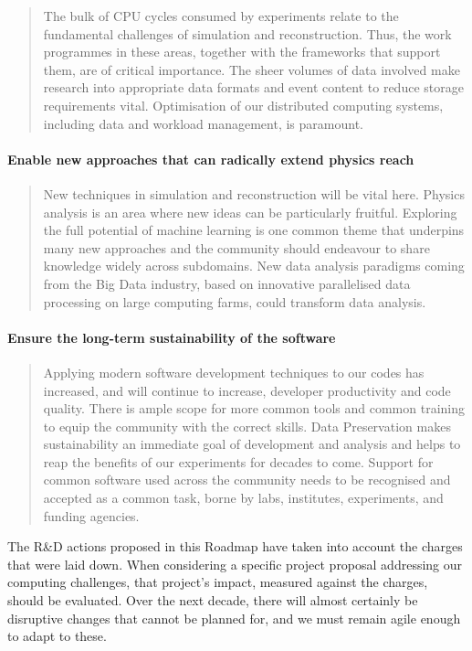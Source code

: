\begin{quote}
The bulk of CPU cycles consumed by experiments relate to the fundamental
challenges of simulation and reconstruction. Thus, the work programmes
in these areas, together with the frameworks that support them, are of
critical importance. The sheer volumes of data involved make research
into appropriate data formats and event content to reduce storage
requirements vital. Optimisation of our distributed computing systems,
including data and workload management, is paramount.
\end{quote}

\paragraph{Enable new approaches that can radically extend physics reach}

\begin{quote}
New techniques in simulation and reconstruction will be vital here.
Phys\-ics analysis is an area where new ideas can be particularly
fruitful. Exploring the full potential of machine learning is one common
theme that underpins many new approaches and the community should
endeavour to share knowledge widely across subdomains. New data analysis
paradigms coming from the Big Data industry, based on innovative
parallelised data processing on large computing farms, could transform
data analysis.
\end{quote}

\paragraph{Ensure the long-term sustainability of the software}

\begin{quote}
Applying modern software development techniques to our codes has
increased, and will continue to increase, developer productivity and
code quality. There is ample scope for more common tools and common
training to equip the community with the correct skills. Data
Preservation makes sustainability an immediate goal of development and
analysis and helps to reap the benefits of our experiments for decades
to come. Support for common software used across the community needs to
be recognised and accepted as a common task, borne by labs, institutes,
experiments, and funding agencies.
\end{quote}

The R\&D actions proposed in this Roadmap have taken into account the
charges that were laid down. When considering a specific project
proposal addressing our computing challenges, that project's impact, measured
against the charges, should be evaluated. Over the next decade, there
will almost certainly be disruptive changes that cannot be planned for,
and we must remain agile enough to adapt to these.

